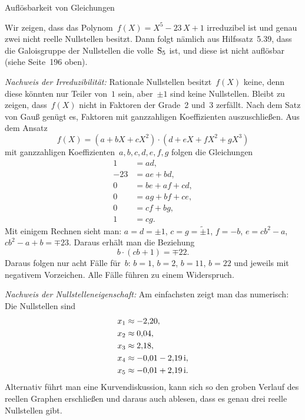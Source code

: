 \documentclass{algblatt}
\begin{document}
\begin{aufgabe}{Auflösbarkeit von Gleichungen}
\begin{loesungE}
\item Wir zeigen, dass das Polynom~$f(X) = X^5 - 23\,X + 1$ irreduzibel ist und
genau zwei nicht reelle Nullstellen besitzt. Dann folgt nämlich aus
Hilfssatz~5.39, dass die Galoisgruppe der Nullstellen die volle~$\mathrm{S}_5$ ist,
und diese ist nicht auflösbar (siehe Seite~196 oben).

\emph{Nachweis der Irreduzibilität:} Rationale Nullstellen besitzt~$f(X)$
keine, denn diese könnten nur Teiler von~$1$ sein, aber~$\pm 1$ sind keine
Nullstellen. Bleibt zu zeigen, dass~$f(X)$ nicht in Faktoren der Grade~2
und~3 zerfällt. Nach dem Satz von Gauß genügt es, Faktoren mit ganzzahligen
Koeffizienten auszuschließen. Aus dem Ansatz
\[ f(X) = (a + bX + cX^2) \cdot (d + eX + fX^2 + gX^3) \]
mit ganzzahligen Koeffizienten~$a,b,c,d,e,f,g$ folgen die Gleichungen
\begin{align*}
  1 &= ad, \\
  -23 &= ae + bd, \\
  0 &= be + af + cd, \\
  0 &= ag + bf + ce, \\
  0 &= cf + bg, \\
  1 &= cg.
\end{align*}
Mit einigem Rechnen sieht man: $a = d = \pm 1$, $c = g = {\tilde\pm} 1$, $f =
-b$, $e = cb^2 - a$, $cb^2 - a + b = \mp 23$. Daraus erhält man die Beziehung
\[ b \cdot (cb + 1) = \mp 22. \]
Daraus folgen nur acht Fälle für~$b$: $b = 1$, $b = 2$, $b = 11$, $b = 22$ und
jeweils mit negativem Vorzeichen. Alle Fälle führen zu einem Widerspruch.

\emph{Nachweis der Nullstelleneigenschaft:} Am einfachsten zeigt man das
numerisch: Die Nullstellen sind
\begin{align*}
  x_1 &\approx -2{,}20, \\
  x_2 &\approx 0{,}04, \\
  x_3 &\approx 2{,}18, \\
  x_4 &\approx -0{,}01 - 2{,}19\,\mathrm{i}, \\
  x_5 &\approx -0{,}01 + 2{,}19\,\mathrm{i}.
\end{align*}
Alternativ führt man eine Kurvendiskussion, kann sich so den groben Verlauf des
reellen Graphen erschließen und daraus auch ablesen, dass es genau drei reelle
Nullstellen gibt.
\end{loesungE}
\end{aufgabe}
\end{document}
